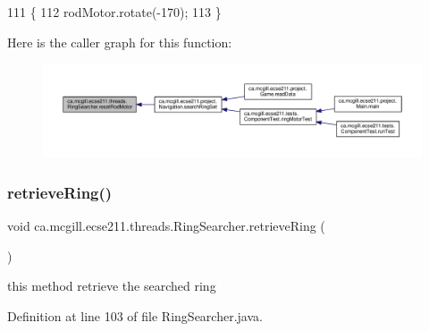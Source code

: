 \begin{DoxyCode}
111                               \{
112     rodMotor.rotate(-170);
113   \}
\end{DoxyCode}
Here is the caller graph for this function\+:
\nopagebreak
\begin{figure}[H]
\begin{center}
\leavevmode
\includegraphics[width=350pt]{classca_1_1mcgill_1_1ecse211_1_1threads_1_1_ring_searcher_a3d6f49addfa2bd5d61903287c68aefd6_icgraph}
\end{center}
\end{figure}
\mbox{\label{classca_1_1mcgill_1_1ecse211_1_1threads_1_1_ring_searcher_abd7a2651a7c5de76a018664c8bf327af}} 
\subsubsection{\texorpdfstring{retrieve\+Ring()}{retrieveRing()}}
{\footnotesize\ttfamily void ca.\+mcgill.\+ecse211.\+threads.\+Ring\+Searcher.\+retrieve\+Ring (\begin{DoxyParamCaption}{ }\end{DoxyParamCaption})}

this method retrieve the searched ring 

Definition at line 103 of file Ring\+Searcher.\+java.


